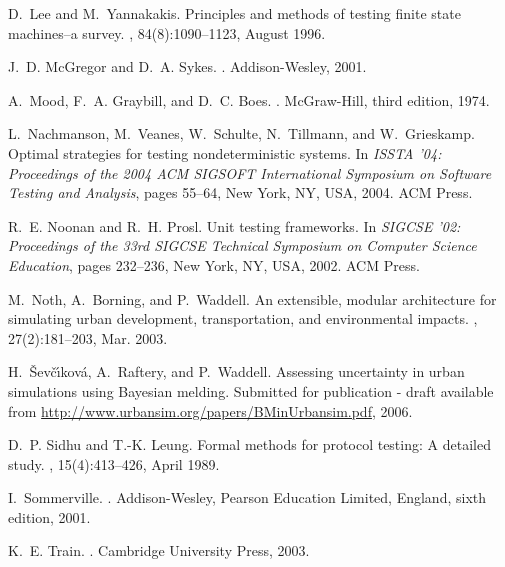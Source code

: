 \documentclass{sig-alternate-preprint}
\begin{document}
\begin{thebibliography}{10}
D.~Lee and M.~Yannakakis.
\newblock Principles and methods of testing finite state machines--a survey.
, 84(8):1090--1123, August 1996.

J.~D. McGregor and D.~A. Sykes.
.
\newblock Addison-Wesley, 2001.

A.~Mood, F.~A. Graybill, and D.~C. Boes.
.
\newblock McGraw-Hill, third edition, 1974.

L.~Nachmanson, M.~Veanes, W.~Schulte, N.~Tillmann, and W.~Grieskamp.
\newblock Optimal strategies for testing nondeterministic systems.
\newblock In {\em ISSTA '04: Proceedings of the 2004 ACM SIGSOFT International
  Symposium on Software Testing and Analysis}, pages 55--64, New York, NY, USA,
  2004. ACM Press.

\newpage

R.~E. Noonan and R.~H. Prosl.
\newblock Unit testing frameworks.
\newblock In {\em SIGCSE '02: Proceedings of the 33rd SIGCSE Technical
  Symposium on Computer Science Education}, pages 232--236, New York, NY, USA,
  2002. ACM Press.

M.~Noth, A.~Borning, and P.~Waddell.
\newblock An extensible, modular architecture for simulating urban development,
  transportation, and environmental impacts.
, 27(2):181--203, Mar.
  2003.

H.~{\v{S}}ev\v{c}\'{\i}kov\'{a}, A.~Raftery, and P.~Waddell.
\newblock Assessing uncertainty in urban simulations using {Bayesian} melding.
\newblock Submitted for publication - draft available from
  \url{http://www.urbansim.org/papers/BMinUrbansim.pdf}, 2006.

D.~P. Sidhu and T.-K. Leung.
\newblock Formal methods for protocol testing: A detailed study.
, 15(4):413--426,
  April 1989.

I.~Sommerville.
.
\newblock Addison-Wesley, Pearson Education Limited, England, sixth edition,
  2001.

\newpage

K.~E. Train.
.
\newblock Cambridge University Press, 2003.


\end{thebibliography}
\end{document}
